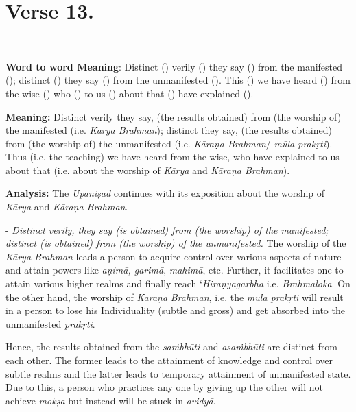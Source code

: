 \chapter{Verse 13.}

\begin{moolashloka}
\\
\end{moolashloka}

\textbf{Word to word Meaning}: Distinct () verily () they say () from the manifested (); distinct () they say () from the unmanifested (). This () we have heard () from the wise () who () to us () about that () have explained ().

\textbf{Meaning:} Distinct verily they say, (the results obtained) from (the worship of) the manifested (i.e. \emph{Kārya Brahman}); distinct they say, (the results obtained) from (the worship of) the unmanifested (i.e. \emph{Kāraṇa Brahman}/ \emph{mūla prakṛti}). Thus (i.e. the teaching) we have heard from the wise, who have explained to us about that (i.e. about the worship of \emph{Kārya} and \emph{Kāraṇa Brahman}).

\textbf{Analysis:} The \emph{Upaniṣad} continues with its exposition about the worship of \emph{Kārya} and \emph{Kāraṇa Brahman}.

 - \emph{Distinct verily, they say (is obtained) from (the worship) of the manifested; distinct (is obtained) from (the worship) of the unmanifested.} The worship of the \emph{Kārya Brahman} leads a person to acquire control over various aspects of nature and attain powers like \emph{aṇimā, garimā}, \emph{mahimā}, etc. Further, it facilitates one to attain various higher realms and finally reach `\emph{Hiraṇyagarbha} i.e. \emph{Brahmaloka}. On the other hand, the worship of \emph{Kāraṇa} \emph{Brahman}, i.e. the \emph{mūla prakṛti} will result in a person to lose his Individuality (subtle and gross) and get absorbed into the unmanifested \emph{prakṛti}.

Hence, the results obtained from the \emph{saṁbhūti} and \emph{asaṁbhūti} are distinct from each other. The former leads to the attainment of knowledge and control over subtle realms and the latter leads to temporary attainment of unmanifested state. Due to this, a person who practices any one by giving up the other will not achieve \emph{mokṣa} but instead will be stuck in \emph{avidyā}.

